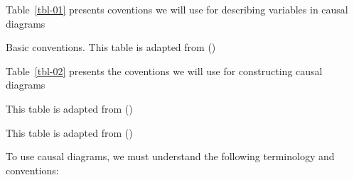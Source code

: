 \documentclass[
  singlecolumn]{article}
\begin{document}
Table~\ref{tbl-01} presents coventions we will use for describing
variables in causal diagrams

\begin{table}

\caption{\label{tbl-02}Basic conventions. This table is adapted from
()}

\centering{

\terminologygeneral

}

\end{table}%

Table~\ref{tbl-02} presents the coventions we will use for constructing
causal diagrams

\begin{table}

\caption{\label{tbl-03}This table is adapted from
()}

\centering{

\terminologydirectedgraph

}

\end{table}%

\begin{table}

\caption{\label{tbl-04}This table is adapted from
()}

\centering{

\terminologyelconfounders

}

\end{table}%

To use causal diagrams, we must understand the following terminology and
conventions:
\end{document}
